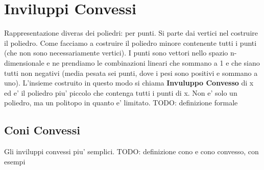 \section{Inviluppi Convessi}
Rappresentazione diveras dei poliedri: per punti. Si parte dai vertici nel costruire il poliedro. Come facciamo a costruire il poliedro minore contenente tutti i punti (che non sono necessariamente vertici). I punti sono vettori nello spazio n-dimensionale e ne prendiamo le combinazioni lineari che sommano a 1 e che siano tutti non negativi (media pesata sei punti, dove i pesi sono positivi e sommano a uno). L'insieme costruito in questo modo si chiama \textbf{Invuluppo Convesso} di x ed e' il poliedro piu' piccolo che contenga tutti i punti di x. Non e' solo un poliedro, ma un politopo in quanto e' limitato. TODO: definizione formale



\subsection{Coni Convessi}
Gli inviluppi convessi piu' semplici. TODO: definizione cono e cono convesso, con esempi


